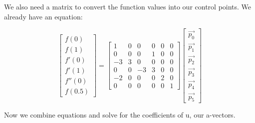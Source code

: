 \documentclass{letter}
\begin{document}
We also need a matrix to convert the function values into our control points. We already have an equation: 

$$
\begin{bmatrix}
f(0) \\
f(1) \\
f'(0) \\
f'(1) \\
f''(0) \\
f(0.5)
\end{bmatrix}
=
\begin{bmatrix}
1 & 0 & 0 & 0 & 0 & 0 \\
0 & 0 & 0 & 1 & 0 & 0 \\
-3 & 3 & 0 & 0 & 0 & 0 \\
0 & 0 & -3 & 3 & 0 & 0 \\
-2 & 0 & 0 & 0 & 2 & 0 \\
0 & 0 & 0 & 0 & 0 & 1
\end{bmatrix}
\begin{bmatrix}
\vec{p_0} \\
\vec{p_1} \\
\vec{p_2} \\
\vec{p_3} \\
\vec{p_4} \\
\vec{p_5} 
\end{bmatrix}
$$

Now we combine equations and solve for the coefficients of u, our a-vectors. 
\end{document}
